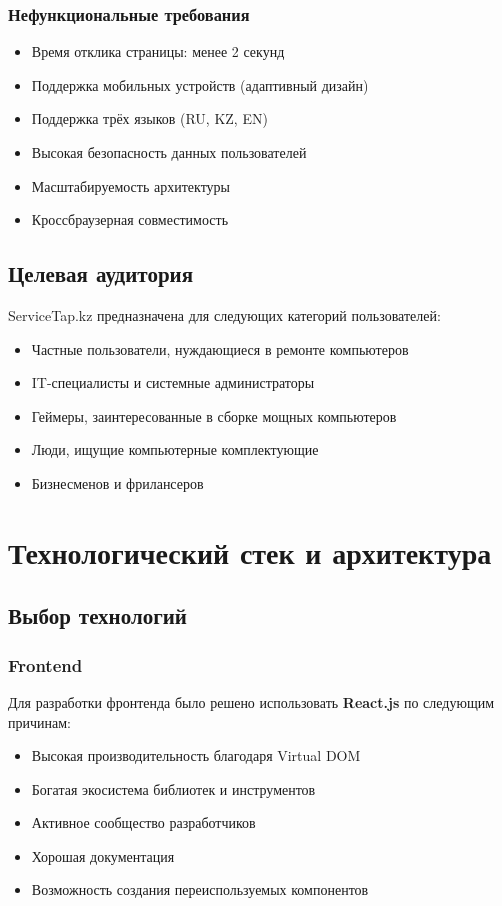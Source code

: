 \documentclass[12pt,a4paper]{report}
\begin{document}
\subsection{Нефункциональные требования}
\begin{itemize}
    \item Время отклика страницы: менее 2 секунд
    \item Поддержка мобильных устройств (адаптивный дизайн)
    \item Поддержка трёх языков (RU, KZ, EN)
    \item Высокая безопасность данных пользователей
    \item Масштабируемость архитектуры
    \item Кроссбраузерная совместимость
\end{itemize}

\section{Целевая аудитория}
ServiceTap.kz предназначена для следующих категорий пользователей:

\begin{itemize}
    \item Частные пользователи, нуждающиеся в ремонте компьютеров
    \item IT-специалисты и системные администраторы
    \item Геймеры, заинтересованные в сборке мощных компьютеров
    \item Люди, ищущие компьютерные комплектующие
    \item Бизнесменов и фрилансеров
\end{itemize}

\newpage

\chapter{Технологический стек и архитектура}

\section{Выбор технологий}

\subsection{Frontend}
Для разработки фронтенда было решено использовать \textbf{React.js} по следующим причинам:
\begin{itemize}
    \item Высокая производительность благодаря Virtual DOM
    \item Богатая экосистема библиотек и инструментов
    \item Активное сообщество разработчиков
    \item Хорошая документация
    \item Возможность создания переиспользуемых компонентов
\end{itemize}
\end{document}
